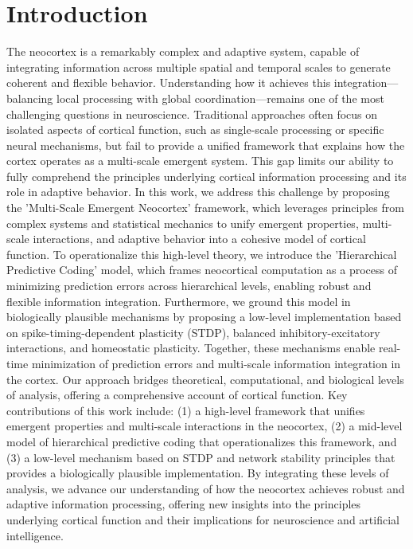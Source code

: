 \documentclass{article}
\begin{document}
\section{Introduction}
The neocortex is a remarkably complex and adaptive system, capable of integrating information across multiple spatial and temporal scales to generate coherent and flexible behavior. Understanding how it achieves this integration—balancing local processing with global coordination—remains one of the most challenging questions in neuroscience. Traditional approaches often focus on isolated aspects of cortical function, such as single-scale processing or specific neural mechanisms, but fail to provide a unified framework that explains how the cortex operates as a multi-scale emergent system. This gap limits our ability to fully comprehend the principles underlying cortical information processing and its role in adaptive behavior. In this work, we address this challenge by proposing the 'Multi-Scale Emergent Neocortex' framework, which leverages principles from complex systems and statistical mechanics to unify emergent properties, multi-scale interactions, and adaptive behavior into a cohesive model of cortical function. To operationalize this high-level theory, we introduce the 'Hierarchical Predictive Coding' model, which frames neocortical computation as a process of minimizing prediction errors across hierarchical levels, enabling robust and flexible information integration. Furthermore, we ground this model in biologically plausible mechanisms by proposing a low-level implementation based on spike-timing-dependent plasticity (STDP), balanced inhibitory-excitatory interactions, and homeostatic plasticity. Together, these mechanisms enable real-time minimization of prediction errors and multi-scale information integration in the cortex. Our approach bridges theoretical, computational, and biological levels of analysis, offering a comprehensive account of cortical function. Key contributions of this work include: (1) a high-level framework that unifies emergent properties and multi-scale interactions in the neocortex, (2) a mid-level model of hierarchical predictive coding that operationalizes this framework, and (3) a low-level mechanism based on STDP and network stability principles that provides a biologically plausible implementation. By integrating these levels of analysis, we advance our understanding of how the neocortex achieves robust and adaptive information processing, offering new insights into the principles underlying cortical function and their implications for neuroscience and artificial intelligence.
\end{document}
